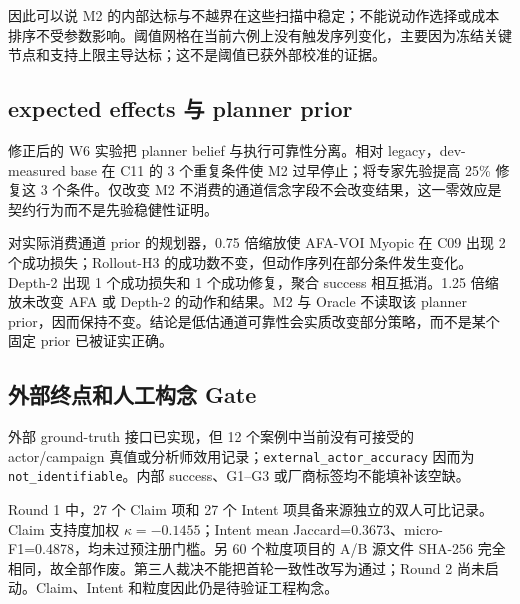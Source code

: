 \documentclass[conference,a4paper,10pt]{IEEEtran}
\begin{document}
\begin{table}[t]
  \centering
  \caption{参数治理扫描与动作序列稳定性}
  \label{tab:governance-scan}
\end{table}
因此可以说 M2 的内部达标与不越界在这些扫描中稳定；不能说动作选择或成本排序不受参数影响。阈值网格在当前六例上没有触发序列变化，主要因为冻结关键节点和支持上限主导达标；这不是阈值已获外部校准的证据。

\subsection{expected effects 与 planner prior}
修正后的 W6 实验把 planner belief 与执行可靠性分离。相对 legacy，dev-measured base 在 C11 的 3 个重复条件使 M2 过早停止；将专家先验提高 25\% 修复这 3 个条件。仅改变 M2 不消费的通道信念字段不会改变结果，这一零效应是契约行为而不是先验稳健性证明。

对实际消费通道 prior 的规划器，0.75 倍缩放使 AFA-VOI Myopic 在 C09 出现 2 个成功损失；Rollout-H3 的成功数不变，但动作序列在部分条件发生变化。Depth-2 出现 1 个成功损失和 1 个成功修复，聚合 success 相互抵消。1.25 倍缩放未改变 AFA 或 Depth-2 的动作和结果。M2 与 Oracle 不读取该 planner prior，因而保持不变。结论是低估通道可靠性会实质改变部分策略，而不是某个固定 prior 已被证实正确。

\subsection{外部终点和人工构念 Gate}
外部 ground-truth 接口已实现，但 12 个案例中当前没有可接受的 actor/campaign 真值或分析师效用记录；\texttt{external\_actor\_accuracy} 因而为 \texttt{not\_identifiable}。内部 success、G1–G3 或厂商标签均不能填补该空缺。

Round 1 中，27 个 Claim 项和 27 个 Intent 项具备来源独立的双人可比记录。Claim 支持度加权 $\kappa=-0.1455$；Intent mean Jaccard=0.3673、micro-F1=0.4878，均未过预注册门槛。另 60 个粒度项目的 A/B 源文件 SHA-256 完全相同，故全部作废。第三人裁决不能把首轮一致性改写为通过；Round 2 尚未启动。Claim、Intent 和粒度因此仍是待验证工程构念。
\end{document}
